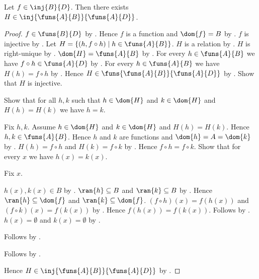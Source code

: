 \begin{theorem}\label{function_space_codom_injection}
    Let $f\in\inj{B}{D}$.
    Then there exists $H\in\inj{\funs{A}{B}}{\funs{A}{D}}$.
\end{theorem}
\begin{proof}
    $f\in\funs{B}{D}$ by .
    Hence $f$ is a function and $\dom{f}=B$
        by .
    $f$ is injective by .
    Let $H=\{(h,f\circ h)\mid h\in\funs{A}{B}\}$.
    $H$ is a relation by .
    $H$ is right-unique by .
    $\dom{H}=\funs{A}{B}$ by .
    For every $h\in\funs{A}{B}$ we have $f\circ h\in\funs{A}{D}$
        by .
    For every $h\in\funs{A}{B}$ we have $H(h)=f\circ h$
        by .
    Hence $H\in\funs{\funs{A}{B}}{\funs{A}{D}}$
        by .
    Show that $H$ is injective.
    \begin{subproof}
        Show that for all $h,k$ such that $h\in\dom{H}$ and
            $k\in\dom{H}$ and $H(h)=H(k)$ we have $h=k$.
        \begin{subproof}
            Fix $h,k$.
            Assume $h\in\dom{H}$ and $k\in\dom{H}$ and $H(h)=H(k)$.
            Hence $h,k\in\funs{A}{B}$.
            Hence $h$ and $k$ are functions and $\dom{h}=A=\dom{k}$
                by .
            $H(h)=f\circ h$ and $H(k)=f\circ k$
                by .
            Hence $f\circ h=f\circ k$.
            Show that for every $x$ we have $h(x)=k(x)$.
            \begin{subproof}
                Fix $x$.
                \begin{byCase}
                        $h(x),k(x)\in B$ by .
                        $\ran{h}\subseteq B$ and $\ran{k}\subseteq B$
                            by .
                        Hence $\ran{h}\subseteq\dom{f}$ and
                            $\ran{k}\subseteq\dom{f}$.
                        $(f\circ h)(x)=f(h(x))$ and
                            $(f\circ k)(x)=f(k(x))$
                            by .
                        Hence $f(h(x))=f(k(x))$.
                        Follows by .
                        $h(x)=\emptyset$ and $k(x)=\emptyset$
                            by .
                \end{byCase}
            \end{subproof}
            Follows by .
        \end{subproof}
        Follows by .
    \end{subproof}
    Hence $H\in\inj{\funs{A}{B}}{\funs{A}{D}}$
        by .
\end{proof}

